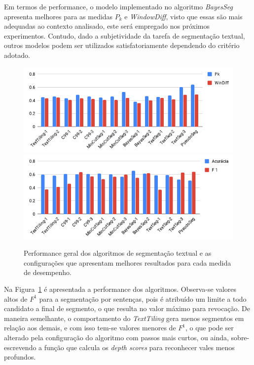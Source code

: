 Em termos de performance, o modelo implementado no algoritmo \textit{BayesSeg} apresenta melhores para as medidas $P_k$ e \textit{WindowDiff}, visto que essas são mais adequadas ao contexto analisado, este será empregado nos próximos experimentos. Contudo, dado a subjetividade da tarefa de segmentação textual, outros modelos podem ser utilizados satisfatoriamente dependendo do critério adotado. 


\begin{figure}[!ht] \centering     %

		\includegraphics[width=.82\textwidth]{conteudo/capitulos/figs/graficos/resumo-wd-pk.png}	
		\label{fig:resumo-wd-pka}
		\includegraphics[width=.82\textwidth]{conteudo/capitulos/figs/graficos/resumo-tradicionais.png}	
		\label{fig:resumo-tradicionaisa}
	\caption{Performance geral dos algoritmos de segmentação textual e as configurações que apresentam melhores resultados para cada medida de desempenho.}
	\label{fig:resumo-segmentadores}
\end{figure}




Na Figura~\ref{fig:resumo-segmentadores} é apresentada a performance dos algoritmos.
Observa-se valores altos de $F^1$ para a segmentação por sentenças, pois é atribuído um limite a todo candidato a final de segmento, o que resulta no valor máximo para revocação. De maneira semelhante, o comportamento do \textit{TextTiling} gera menos segmentos em relação aos demais, e com isso tem-se valores menores de $F^1$, o que pode ser alterado pela configuração do algoritmo com passos mais curtos, ou ainda, sobre-escrevendo a função que calcula os \textit{depth scores} para reconhecer vales menos profundos.



